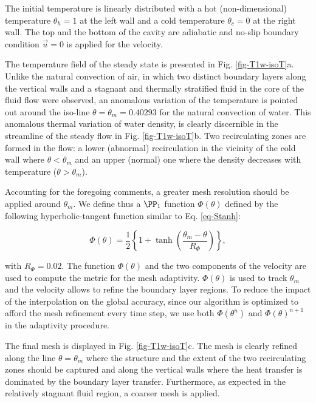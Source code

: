 \noindent The initial temperature is linearly distributed with a hot (non-dimensional) temperature $\theta_h =1$ at the left wall and a cold temperature $\theta_c=0$ at the right wall. %
The top and the bottom of the cavity are adiabatic and no-slip boundary condition $\vec u = 0$ is applied for the velocity.

The temperature field of the steady state is presented in Fig. \ref{fig-T1w-isoT}a.
Unlike the natural convection of air, in which two distinct boundary layers along the vertical walls and a stagnant and thermally stratified fluid in the core of the fluid flow were observed, an anomalous variation of the temperature is pointed out around the iso-line $\theta = \theta_m = 0.40293$ for the natural convection of water.
This anomalous thermal variation of water density, is clearly discernible in the streamline of the steady flow in Fig. \ref{fig-T1w-isoT}b.
Two recirculating zones are formed in the flow: a lower (abnormal) recirculation  in the vicinity of the cold wall where $\theta<\theta_m$ and an upper (normal) one where the density decreases with temperature ($\theta>\theta_m$).

Accounting for the foregoing comments, a greater mesh resolution should be applied around $\theta_m$.
We define thus a $\PP_1$ function $\Phi(\theta)$ defined by the following hyperbolic-tangent function similar to Eq. \ref{eq-Stanh}:

\begin{equation}
\Phi(\theta) =  \frac{1}{2}\left\{
1 + \tanh\left(\frac{\theta_m-\theta}{R_{\Phi}}\right)
\right\},
\label{eq-Stm}
\end{equation} 

\noindent with $R_{\Phi}=0.02$. 
The function $\Phi(\theta)$ and the two components of the velocity are used to compute the metric for the mesh adaptivity.
$\Phi(\theta)$ is used to track $\theta_m$ and the velocity allows to refine the boundary layer regions.
To reduce the impact of the interpolation on the global accuracy, since our algorithm is optimized to afford the mesh refinement every time step, we use both $\Phi(\theta^n)$ and $\Phi(\theta)^{n+1}$ in the adaptivity procedure.

\noindent The final mesh is displayed in Fig. \ref{fig-T1w-isoT}c.
The mesh is clearly refined along the line $\theta = \theta_m$ where  the structure and the extent of the two recirculating zones should be captured and along the vertical walls where the heat transfer is dominated by the boundary layer transfer.
Furthermore, as expected in the relatively stagnant fluid region, a coarser mesh is applied.

